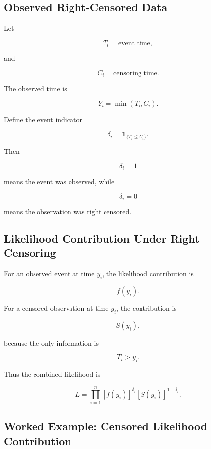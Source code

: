 \subsection{Observed Right-Censored Data}
\label{subsec:observed-right-censored-data}

Let

\[
T_i
=
\text{event time},
\]

and

\[
C_i
=
\text{censoring time}.
\]

The observed time is

\[
\boxed{
Y_i
=
\min(T_i,C_i).
}
\]

Define the event indicator

\[
\boxed{
\delta_i
=
\mathbf{1}_{\{T_i\leq C_i\}}.
}
\]

Then

\[
\delta_i=1
\]

means the event was observed, while

\[
\delta_i=0
\]

means the observation was right censored.

\subsection{Likelihood Contribution Under Right Censoring}
\label{subsec:right-censoring-likelihood}

For an observed event at time \(y_i\), the likelihood contribution is

\[
f(y_i).
\]

For a censored observation at time \(y_i\), the contribution is

\[
S(y_i),
\]

because the only information is

\[
T_i>y_i.
\]

Thus the combined likelihood is

\[
\boxed{
L
=
\prod_{i=1}^{n}
[
f(y_i)
]^{\delta_i}
[
S(y_i)
]^{1-\delta_i}.
}
\]

\subsection{Worked Example: Censored Likelihood Contribution}
\label{subsec:worked-censored-likelihood}


